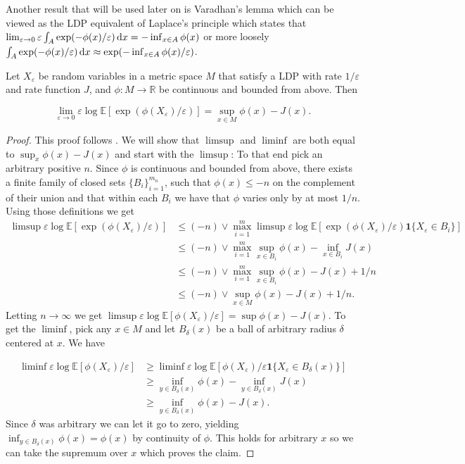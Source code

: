 Another result that will be used later on is Varadhan's lemma which can be viewed as the LDP equivalent of Laplace's principle which states that $\lim_{\varepsilon\rightarrow 0} \varepsilon \int_A \exp(-\phi(x)/\varepsilon)\mathop{}\!\mathrm{d} x = -\inf_{x\in A} \phi(x)$ or more loosely \newline$\int_A \exp(-\phi(x)/\varepsilon)\mathop{}\!\mathrm{d} x\approx\exp(-\inf_{x\in A}\phi(x)/\varepsilon)$.
\begin{lemma}[Varadhan]
	Let $X_\varepsilon$ be random variables in a metric space $M$ that satisfy a LDP with rate $1/\varepsilon$ and rate function $J$, and $\phi:M\rightarrow\mathbb R$ be continuous and bounded from above. Then 
	
	$$\lim_{\varepsilon\rightarrow 0}\varepsilon\log\mathbb E[\exp(\phi(X_\varepsilon)/\varepsilon)]=\sup_{x\in M}\phi(x)-J(x).$$
\end{lemma}
\begin{proof}
	This proof follows \cite{scLDP}. We will show that $\limsup$ and $\liminf$ are both equal to 	$\sup_x \phi(x)-J(x)$ and start with the $\limsup$:
	To that end pick an arbitrary positive $n$. Since $\phi$ is continuous and bounded from above, there exists a finite family of closed sets $\{B_i\}_{i=1}^{m_n}$, such that $\phi(x)\leq -n$ on the complement of their union and that within each $B_i$ we have that $\phi$ varies only by at most $1/n$.
	Using those definitions we get
	\begin{align*}
		\limsup\varepsilon\log\mathbb E[\exp(\phi(X_\varepsilon)/\varepsilon)]
		&\leq(-n)\lor\max_{i=1}^m \limsup\varepsilon\log\mathbb E[\exp(\phi(X_\varepsilon)/\varepsilon)\mathbf 1\{X_\varepsilon\in B_i\}]\\
		&\leq(-n)\lor\max_{i=1}^m\sup_{x\in B_i}\phi(x)-\inf_{x\in B_i} J(x)\\
		&\leq(-n)\lor\max_{i=1}^m\sup_{x\in B_i}\phi(x)-J(x)+1/n\\
		&\leq(-n)\lor\sup_{x\in M}\phi(x)-J(x)+1/n.
	\end{align*}
	Letting $n\rightarrow\infty$ we get $\limsup\varepsilon\log\mathbb E[\phi(X_\varepsilon)/\varepsilon]=\sup \phi(x)-J(x)$.
	To get the $\liminf$, pick any $x\in M$ and let $B_{\delta}(x)$ be a ball of arbitrary radius $\delta$ centered at $x$.
	We have
	
	\begin{align*}
		\liminf\varepsilon\log\mathbb E[\phi(X_\varepsilon)/\varepsilon]
		&\geq\liminf\varepsilon\log\mathbb E[\phi(X_\varepsilon)/\varepsilon\mathbf 1\{X_\varepsilon\in B_\delta(x)\}]\\
		&\geq\inf_{y\in B_\delta(x)}\phi(x)-\inf_{y\in B_\delta(x)}J(x)\\
		&\geq\inf_{y\in B_\delta(x)}\phi(x)-J(x).
	\end{align*}
	Since $\delta$ was arbitrary we can let it go to zero, yielding $\inf_{y\in B_\delta(x)}\phi(x)=\phi(x)$ by continuity of $\phi$. This holds for arbitrary $x$ so we can take the supremum over $x$ which proves the claim.
\end{proof}

